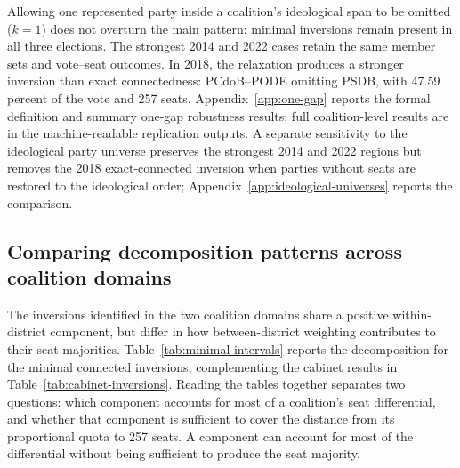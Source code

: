 \documentclass[11pt]{article}
\begin{document}
\begin{samepage}
Allowing one represented party inside a coalition's ideological span to be
omitted (\(k=1\)) does not overturn the main pattern: minimal inversions
remain present in all three elections. The strongest 2014 and 2022 cases
retain the same member sets and vote--seat outcomes. In 2018, the
relaxation produces a stronger inversion than exact connectedness:
PCdoB--PODE omitting PSDB, with 47.59 percent of the vote and 257 seats.
Appendix~\ref{app:one-gap} reports the formal definition and summary
one-gap robustness results; full coalition-level results are in the
machine-readable replication outputs. A separate sensitivity to the ideological
party universe preserves the strongest 2014 and 2022 regions but removes
the 2018 exact-connected inversion when parties without seats are restored
to the ideological order; Appendix~\ref{app:ideological-universes}
reports the comparison.


\end{samepage}


\subsection{Comparing decomposition patterns across coalition domains}
\label{sec:decomposition}


The inversions identified in the two coalition domains share a positive
within-district component, but differ in how between-district weighting
contributes to their seat majorities. Table~\ref{tab:minimal-intervals}
reports the decomposition for the minimal connected inversions,
complementing the cabinet results in
Table~\ref{tab:cabinet-inversions}. Reading the tables together separates
two questions: which component accounts for most of a coalition's seat
differential, and whether that component is sufficient to cover the
distance from its proportional quota to 257 seats. A component can account
for most of the differential without being sufficient to produce the
seat majority.
\end{document}
